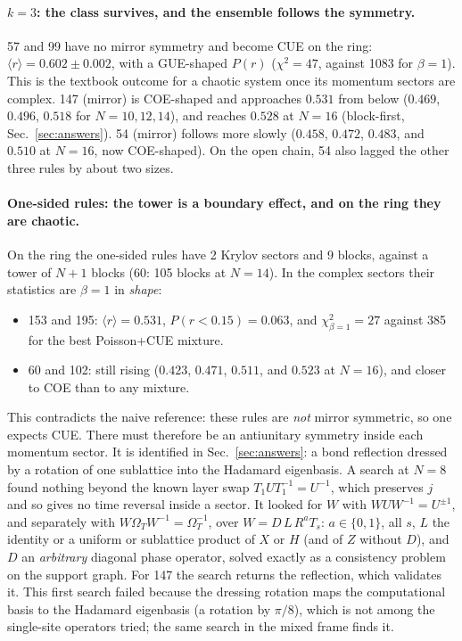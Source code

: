\paragraph{$k=3$: the class survives, and the ensemble follows the symmetry.}
57 and 99 have no mirror symmetry and become CUE on the ring: $\langle r\rangle=0.602\pm0.002$, with a GUE-shaped
$P(r)$ ($\chi^2=47$, against 1083 for $\beta=1$). This is the textbook outcome for a chaotic system once its momentum
sectors are complex. 147 (mirror) is COE-shaped and approaches $0.531$ from below ($0.469$, $0.496$, $0.518$ for
$N=10,12,14$), and reaches $0.528$ at $N=16$ (block-first, Sec.~\ref{sec:answers}). 54 (mirror) follows more slowly
($0.458$, $0.472$, $0.483$, and $0.510$ at $N=16$, now COE-shaped). On the open chain, 54 also lagged the other
three rules by about two sizes.

\paragraph{One-sided rules: the tower is a boundary effect, and on the ring they are chaotic.}
On the ring the one-sided rules have 2 Krylov sectors and 9 blocks, against a tower of $N+1$ blocks (60: 105 blocks at
$N=14$). In the complex sectors their statistics are $\beta=1$ in \emph{shape}:
\begin{itemize}
\item 153 and 195: $\langle r\rangle=0.531$, $P(r<0.15)=0.063$, and $\chi^2_{\beta=1}=27$ against 385 for the best
  Poisson+CUE mixture.
\item 60 and 102: still rising ($0.423$, $0.471$, $0.511$, and $0.523$ at $N=16$), and closer to COE than to any
  mixture.
\end{itemize}
This contradicts the naive reference: these rules are \emph{not} mirror symmetric, so one expects CUE. There must
therefore be an antiunitary symmetry inside each momentum sector. It is identified in Sec.~\ref{sec:answers}: a bond
reflection dressed by a rotation of one sublattice into the Hadamard eigenbasis. A search at $N=8$ found nothing beyond the known layer swap $T_1UT_1^{-1}=U^{-1}$, which preserves $j$ and so gives no
time reversal inside a sector. It looked for $W$ with $WUW^{-1}=U^{\pm1}$, and separately with
$W\Omega_TW^{-1}=\Omega_T^{-1}$, over $W=D\,L\,R^aT_s$: $a\in\{0,1\}$, all $s$, $L$ the identity or a uniform or
sublattice product of $X$ or $H$ (and of $Z$ without $D$), and $D$ an \emph{arbitrary} diagonal phase operator, solved
exactly as a consistency problem on the support graph. For 147 the search returns the reflection, which validates it.
This first search failed because the dressing rotation maps the computational basis to the Hadamard eigenbasis (a
rotation by $\pi/8$), which is not among the single-site operators tried; the same search in the mixed frame finds it.

